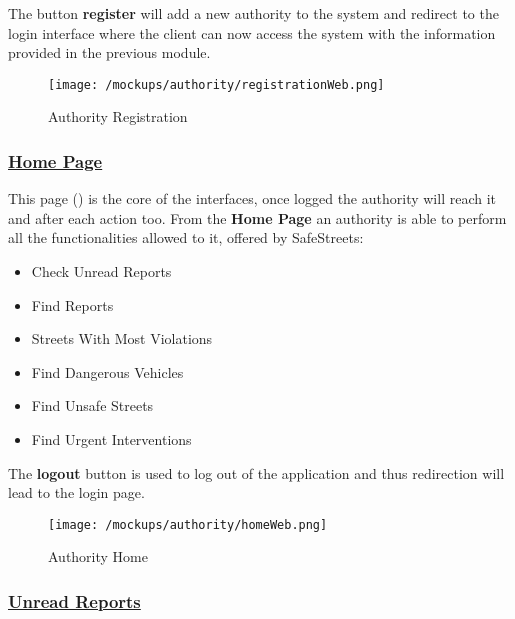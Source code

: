 				The button \textbf{register} will add a new authority to the system and redirect to the login interface where the client can now access the system with the information provided in the previous module.
				
				\newpage
				
				\begin{figure}[ht!]
					\centering
					\texttt{[image: /mockups/authority/registrationWeb.png]}
					\caption{\label{fig:registrationWeb} Authority Registration}
				\end{figure}
			
			\subsubsection[Home Page]{\hyperlink{toc}{Home Page}}
				\label{sec:authorityHomePage}
				
				This page () is the core of the interfaces, once logged the authority will reach it and after each action too. From the \textbf{Home Page} an authority is able to perform all the functionalities allowed to it, offered by SafeStreets:
				
				\begin{itemize}
					\item Check Unread Reports
					\item Find Reports
					\item Streets With Most Violations
					\item Find Dangerous Vehicles
					\item Find Unsafe Streets
					\item Find Urgent Interventions
				\end{itemize}
			
				The \textbf{logout} button is used to log out of the application and thus redirection will lead to the login page.
				
				\newpage
				
				\begin{figure}[ht!]
					\centering
					\texttt{[image: /mockups/authority/homeWeb.png]}
					\caption{\label{fig:homeWeb} Authority Home}
				\end{figure}
			
			\subsubsection[Unread Reports]{\hyperlink{toc}{Unread Reports}}
				\label{sec:authorityCheckReports}
				
